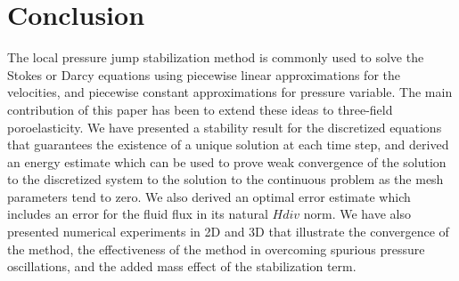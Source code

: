\section{Conclusion}
The local pressure jump stabilization method \cite{burman2007unified} is commonly used to solve the Stokes or Darcy equations using piecewise linear approximations for the velocities, and piecewise constant approximations for pressure variable. The main contribution of this paper has been to extend these ideas to three-field poroelasticity. We have presented a stability result for the discretized equations that guarantees the existence of a unique solution at each time step, and derived an energy estimate which can be used to prove weak convergence of the solution to the discretized system to the solution to the continuous problem as the mesh parameters tend to zero. We also derived an optimal error estimate which includes an error for the fluid flux in its natural $H{div}$ norm. We have also presented numerical experiments in 2D and 3D that illustrate the convergence of the method, the effectiveness of the method in overcoming spurious pressure oscillations, and the added mass effect of the stabilization term.
